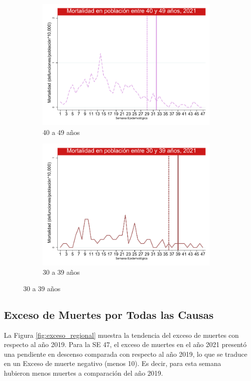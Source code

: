 \documentclass[12pt,a4paper,openany]{book}
\begin{document}
\begin{figure}[h]
	\vspace{10mm}
	\begin{subfigure}[b]{0.45\textwidth}
		\centering
		\includegraphics[width=\textwidth]{../figuras/mortalidad_edad_40.pdf}
		\caption{40 a 49 años}
	\end{subfigure}
	\hfill
	\begin{subfigure}[b]{0.45\textwidth}
		\centering
		\includegraphics[width=\textwidth]{../figuras/mortalidad_edad_30.pdf}
		\caption{30 a 39 años}
	\end{subfigure}
	\end{figure}

\clearpage
	
	\subsection*{Exceso de Muertes por Todas las Causas}
	\noindent  La Figura \ref{fig:exceso_regional} muestra la tendencia del exceso de muertes con respecto al año 2019. Para la SE 47, el exceso de muertes en el año 2021 presentó una pendiente en descenso comparada con respecto al año 2019, lo que se traduce en un Exceso de muerte negativo (menos 10). Es decir, para esta semana hubieron menos muertes a comparación del año 2019.   
\end{document}
